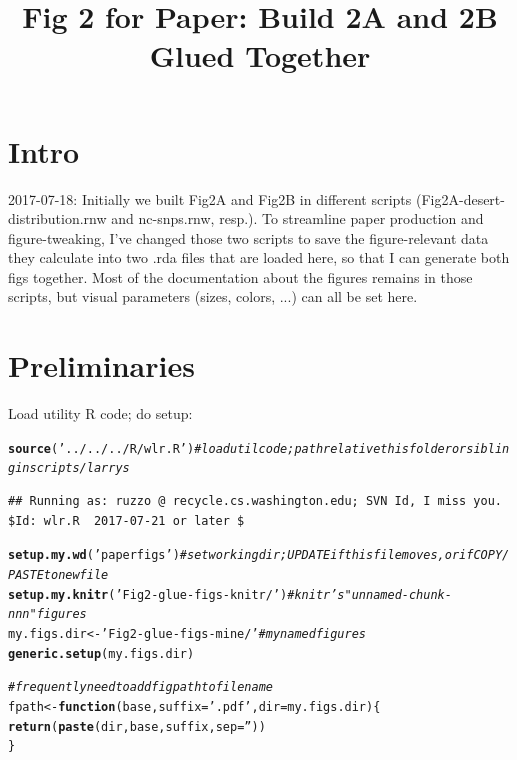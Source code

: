 \documentclass{article}\usepackage[]{graphicx}\usepackage[]{color}
\makeatletter
\newcommand{\hlstr}[1]{\textcolor[rgb]{0.192,0.494,0.8}{#1}}%
\newcommand{\hlcom}[1]{\textcolor[rgb]{0.678,0.584,0.686}{\textit{#1}}}%
\newcommand{\hlstd}[1]{\textcolor[rgb]{0.345,0.345,0.345}{#1}}%
\newcommand{\hlkwa}[1]{\textcolor[rgb]{0.161,0.373,0.58}{\textbf{#1}}}%
\newcommand{\hlkwb}[1]{\textcolor[rgb]{0.69,0.353,0.396}{#1}}%
\newcommand{\hlkwc}[1]{\textcolor[rgb]{0.333,0.667,0.333}{#1}}%
\newcommand{\hlkwd}[1]{\textcolor[rgb]{0.737,0.353,0.396}{\textbf{#1}}}%
\newenvironment{kframe}{%
 \def\at@end@of@kframe{}%
 \ifinner\ifhmode%
  \def\at@end@of@kframe{\end{minipage}}%
  \begin{minipage}{\columnwidth}%
 \fi\fi%
 \def\FrameCommand##1{\hskip\@totalleftmargin \hskip-\fboxsep
 \colorbox{shadecolor}{##1}\hskip-\fboxsep
     \hskip-\linewidth \hskip-\@totalleftmargin \hskip\columnwidth}%
 \MakeFramed {\advance\hsize-\width
   \@totalleftmargin\z@ \linewidth\hsize
   \@setminipage}}%
 {\par\unskip\endMakeFramed%
 \at@end@of@kframe}
\newenvironment{knitrout}{}{} %
\makeatother
\begin{document}
\title{Fig 2 for Paper: Build 2A and 2B Glued Together}
\maketitle

\tableofcontents

\section{Intro}
2017-07-18: 
Initially we built Fig2A and Fig2B in different scripts (Fig2A-desert-distribution.rnw and nc-snps.rnw, resp.).  To streamline paper production and figure-tweaking, I've changed those two scripts to save the figure-relevant data they calculate into two .rda files that are loaded here, so that I can generate both figs together.  Most of the documentation about the figures remains in those scripts, but visual parameters (sizes, colors, ...) can all be set here.

\section{Preliminaries}
Load utility R code; do setup:

\begin{knitrout}\footnotesize
{}\color{fgcolor}\begin{kframe}
\begin{alltt}
\hlkwd{source}\hlstd{(}\hlstr{'../../../R/wlr.R'}\hlstd{)} \hlcom{# load util code; path relative this folder or sibling in scripts/larrys }
\end{alltt}
\begin{verbatim}
## Running as: ruzzo @ recycle.cs.washington.edu; SVN Id, I miss you.  $Id: wlr.R  2017-07-21 or later $
\end{verbatim}
\begin{alltt}
\hlkwd{setup.my.wd}\hlstd{(}\hlstr{'paperfigs'}\hlstd{)} \hlcom{# set working dir; UPDATE if this file moves, or if COPY/PASTE to new file}
\hlkwd{setup.my.knitr}\hlstd{(}\hlstr{'Fig2-glue-figs-knitr/'}\hlstd{)} \hlcom{# knitr's "unnamed-chunk-nnn" figures}
\hlstd{my.figs.dir} \hlkwb{<-} \hlstr{'Fig2-glue-figs-mine/'}   \hlcom{# my named figures}
\hlkwd{generic.setup}\hlstd{(my.figs.dir)}
\end{alltt}
\end{kframe}
\end{knitrout}
\begin{knitrout}\footnotesize
{}\color{fgcolor}\begin{kframe}
\begin{alltt}
\hlcom{# frequently need to add figpath to file name}
\hlstd{fpath} \hlkwb{<-} \hlkwa{function}\hlstd{(}\hlkwc{base}\hlstd{,} \hlkwc{suffix}\hlstd{=}\hlstr{'.pdf'}\hlstd{,} \hlkwc{dir}\hlstd{=my.figs.dir)\{}
  \hlkwd{return}\hlstd{(}\hlkwd{paste}\hlstd{(dir, base, suffix,} \hlkwc{sep}\hlstd{=}\hlstr{''}\hlstd{))}
\hlstd{\}}
\end{alltt}
\end{kframe}
\end{knitrout}
\end{document}
